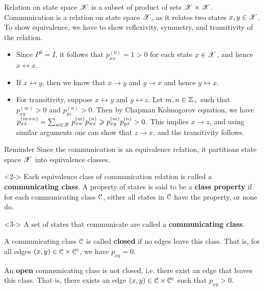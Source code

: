 \documentclass[12pt,aspectratio=169]{beamer}
\begin{document}
\begin{frame}
\begin{Proof} 
Relation on state space $\mathscr{X}$ is a subset of product of sets $\mathscr{X} \times \mathscr{X}$. 
Communication is a relation on state space $\mathscr{X}$, as it relates two states $x,y \in \mathscr{X}$. 
To show equivalence, we have to show reflexivity, symmetry, and transitivity of the relation. 
\begin{itemize}
\item [Reflexivity:]<2-> Since $P^0 = I$, it follows that $p_{xx}^{(0)} = 1 > 0$ for each state $x\in\mathscr{X}$, and hence $x\leftrightarrow x$. %
\item [Symmetry:]<3-> If $x \leftrightarrow y$, then we know that $x \to y$ and $y \to x$ and hence $y \leftrightarrow x$. 
\item [Transitivity:]<4-> For transitivity, suppose $x \leftrightarrow y$ and $y \leftrightarrow z$. 
Let $m,n \in \mathbb{Z}_+$ such that $p_{xy}^{(m)} >0$ and $p_{yz}^{(n)} >0$. 
Then by Chapman Kolmogorov equation, we have
$
p_{xz}^{(m+n)} = \sum_{w \in \mathscr{X}} p_{xw}^{(m)}p_{wz}^{(n)} \geqslant p_{xy}^{(m)}p_{yz}^{(n)} > 0. 
$
This implies $x \to z$, and using similar arguments one can show that $z \to x$, and the transitivity follows.  
\end{itemize}
\end{Proof}
\end{frame}
\begin{frame}
\begin{block}{Reminder}
Since the communication is an equivalence relation, it partitions state space $\mathscr{X}$ into equivalence classes. 
\end{block}
\begin{Definition}<2->
Each equivalence class of communication relation is called a \textbf{communicating class}. 
A property of states is said to be a \textbf{class property} if for each communicating class $\mathcal{C}$, 
either all states in $\mathcal{C}$ have the property, or none do. 
\end{Definition}
\begin{Definition}<3->
A set of states that communicate are called a \textbf{communicating class}. 
\begin{compactenum}[(i)]
\item A communicating class $\mathcal{C}$ is called \textbf{closed} if no edges leave this class. 
That is, for all edges $(x,y) \in \mathcal{C} \times \mathcal{C}^c$, we have $p_{xy} = 0$. 
\item<4-> An \textbf{open} communicating class is not closed, i.e. there exist an edge that leaves this class. 
That is, there exists an edge $(x,y) \in \mathcal{C}\times \mathcal{C}^c$ such that $p_{xy} > 0$.  
\end{compactenum}
\end{Definition}
\end{frame}
\end{document}
